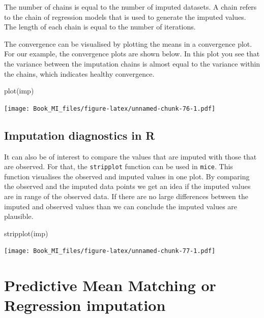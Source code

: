 \documentclass[
]{book}
\newenvironment{Shaded}{\begin{snugshade}}{\end{snugshade}}
\newcommand{\FunctionTok}[1]{\textcolor[rgb]{0.00,0.00,0.00}{#1}}
\newcommand{\NormalTok}[1]{#1}
\begin{document}
The number of chains is equal to the number of imputed datasets. A chain refers to the chain of regression models that is used to generate the imputed values. The length of each chain is equal to the number of iterations.

The convergence can be visualised by plotting the means in a convergence plot. For our example, the convergence plots are shown below. In this plot you see that the variance between the imputation chains is almost equal to the variance within the chains, which indicates healthy convergence.

\begin{Shaded}
\begin{Highlighting}[]
\FunctionTok{plot}\NormalTok{(imp)}
\end{Highlighting}
\end{Shaded}

\texttt{[image: Book\_MI\_files/figure-latex/unnamed-chunk-76-1.pdf]}

\hypertarget{imputation-diagnostics-in-r}{%
\subsection{Imputation diagnostics in R}\label{imputation-diagnostics-in-r}}

It can also be of interest to compare the values that are imputed with those that are observed. For that, the \texttt{stripplot} function can be used in \texttt{mice}. This function visualises the observed and imputed values in one plot. By comparing the observed and the imputed data points we get an idea if the imputed values are in range of the observed data. If there are no large differences between the imputed and observed values than we can conclude the imputed values are plausible.

\begin{Shaded}
\begin{Highlighting}[]
\FunctionTok{stripplot}\NormalTok{(imp)}
\end{Highlighting}
\end{Shaded}

\texttt{[image: Book\_MI\_files/figure-latex/unnamed-chunk-77-1.pdf]}

\hypertarget{predictive-mean-matching-or-regression-imputation}{%
\section{Predictive Mean Matching or Regression imputation}\label{predictive-mean-matching-or-regression-imputation}}
\end{document}
